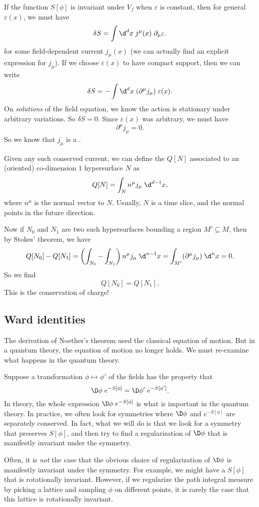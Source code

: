 \documentclass[a4paper]{article}
\begin{document}
If the function $S[\phi]$ is invariant under $V_f$ when $\varepsilon$ is constant, then for general $\varepsilon(x)$, we must have
\[
  \delta S = \int \d^d x\; j^\mu(x)\; \partial_\mu \varepsilon.
\]
for some field-dependent current $j_\mu(x)$ (we can actually find an explicit expression for $j_\mu$). If we choose $\varepsilon(x)$ to have compact support, then we can write
\[
  \delta S = - \int \d^d x\; (\partial^\mu j_\mu)\;\varepsilon(x).
\]
On \emph{solutions} of the field equation, we know the action is stationary under arbitrary variations. So $\delta S = 0$. Since $\varepsilon(x)$ was arbitrary, we must have
\[
  \partial^\mu j_\mu = 0.
\]
So we know that $j_\mu$ is a .

Given any such conserved current, we can define the  $Q[N]$ associated to an (oriented) co-dimension $1$ hypersurface $N$ as
\[
  Q[N] = \int_N n^\mu j_\mu\; \d^{d - 1}x,
\]
where $n^\mu$ is the normal vector to $N$. Usually, $N$ is a time slice, and the normal points in the future direction.

Now if $N_0$ and $N_1$ are two such hypersurfaces bounding a region $M' \subseteq M$, then by Stokes' theorem, we have
\[
  Q[N_0] - Q[N_1] = \left(\int_{N_0} - \int_{N_1}\right) n^\mu j_\mu \;\d^{n - 1}x = \int_{M'} (\partial^\mu j_\mu)\;\d^n x = 0.
\]
So we find
\[
  Q[N_0] = Q[N_1].
\]
This is the conservation of charge!

\subsection{Ward identities}
The derivation of Noether's theorem used the classical equation of motion. But in a quantum theory, the equation of motion no longer holds. We must re-examine what happens in the quantum theory.

Suppose a transformation $\phi \mapsto \phi'$ of the fields has the property that
\[
  \D \phi\; e^{-S[\phi]} = \D \phi'\; e^{-S[\phi']}.
\]
In theory, the whole expression $\D \phi\; e^{-S[\phi]}$ is what is important in the quantum theory. In practice, we often look for symmetries where $\D \phi$ and $e^{-S[\phi]}$ are separately conserved. In fact, what we will do is that we look for a symmetry that preserves $S[\phi]$, and then try to find a regularization of $\D \phi$ that is manifestly invariant under the symmetry.

Often, it is \emph{not} the case that the obvious choice of regularization of $\D \phi$ is manifestly invariant under the symmetry. For example, we might have a $S[\phi]$ that is rotationally invariant. However, if we regularize the path integral measure by picking a lattice and sampling $\phi$ on different points, it is rarely the case that this lattice is rotationally invariant.
\end{document}
